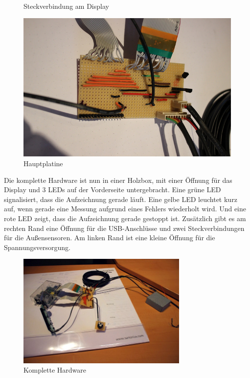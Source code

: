 \begin{figure}[h]
\begin{minipage}[b]{0.45\textwidth}
		\caption{Steckverbindung am Display}
	\end{minipage}\hfill
	\begin{minipage}[b]{0.45\textwidth}
		\centering
		\includegraphics[width=\textwidth]{figures/anschluss/2_4.jpg}
		\caption{Hauptplatine}
	\end{minipage}
\end{figure}

Die komplette Hardware ist nun in einer Holzbox, mit einer Öffnung für das Display und 3  \glspl{LED} auf der Vorderseite untergebracht. Eine grüne \gls{LED} signalisiert, dass die Aufzeichnung gerade läuft. Eine gelbe \gls{LED} leuchtet kurz auf, wenn gerade eine Messung aufgrund eines Fehlers wiederholt wird. Und eine rote \gls{LED} zeigt, dass die Aufzeichnung gerade gestoppt ist. Zusätzlich gibt es am rechten Rand eine Öffnung für die USB-Anschlüsse und zwei Steckverbindungen für die Außensensoren. Am linken Rand ist eine kleine Öffnung für die Spannungsversorgung.

\begin{figure}[h]
	\centering
	\includegraphics[width=0.75\textwidth]{figures/anschluss/2_5.jpg}
	\caption{Komplette Hardware}
\end{figure}	

